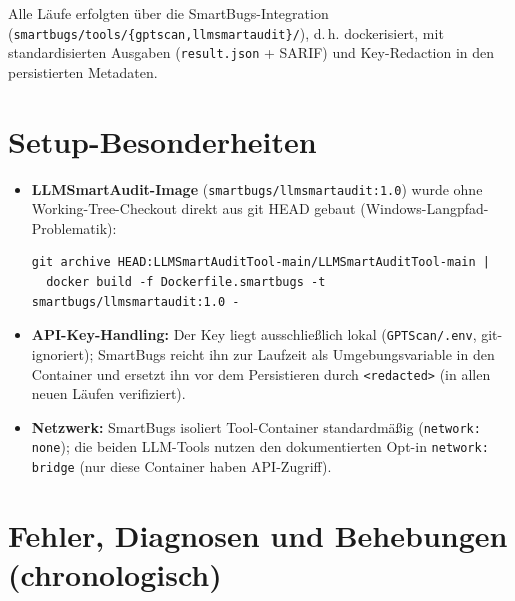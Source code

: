 \documentclass[11pt,a4paper]{scrartcl}
\newcommand{\code}[1]{\texttt{#1}}
\begin{document}
Alle Läufe erfolgten über die SmartBugs-Integration (\code{smartbugs/tools/\{gptscan,\allowbreak llmsmartaudit\}/}), d.\,h. dockerisiert, mit standardisierten Ausgaben (\code{result.json} + SARIF) und Key-Redaction in den persistierten Metadaten.

\section{Setup-Besonderheiten}

\begin{itemize}[nosep]
  \item \textbf{LLMSmartAudit-Image} (\code{smartbugs/llmsmartaudit:1.0}) wurde ohne Working-Tree-Checkout direkt aus git HEAD gebaut (Windows-Langpfad-Problematik):
\begin{lstlisting}
git archive HEAD:LLMSmartAuditTool-main/LLMSmartAuditTool-main |
  docker build -f Dockerfile.smartbugs -t smartbugs/llmsmartaudit:1.0 -
\end{lstlisting}
  \item \textbf{API-Key-Handling:} Der Key liegt ausschließlich lokal (\code{GPTScan/.env}, git-ignoriert); SmartBugs reicht ihn zur Laufzeit als Umgebungsvariable in den Container und ersetzt ihn vor dem Persistieren durch \code{<redacted>} (in allen neuen Läufen verifiziert).
  \item \textbf{Netzwerk:} SmartBugs isoliert Tool-Container standardmäßig (\code{network: none}); die beiden LLM-Tools nutzen den dokumentierten Opt-in \code{network: bridge} (nur diese Container haben API-Zugriff).
\end{itemize}

\section{Fehler, Diagnosen und Behebungen (chronologisch)}
\label{sec:fehler}
\end{document}
